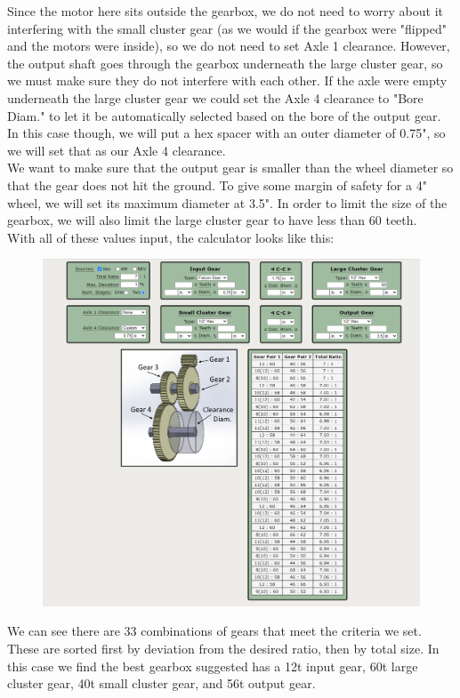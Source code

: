 \documentclass[a4paper]{article}
\begin{document}
	Since the motor here sits outside the gearbox, we do not need to worry about it interfering with the small cluster gear (as we would if the gearbox were "flipped" and the motors were inside), so we do not need to set Axle 1 clearance. However, the output shaft goes through the gearbox underneath the large cluster gear, so we must make sure they do not interfere with each other. If the axle were empty underneath the large cluster gear we could set the Axle 4 clearance to "Bore Diam." to let it be automatically selected based on the bore of the output gear. In this case though, we will put a hex spacer with an outer diameter of 0.75", so we will set that as our Axle 4 clearance.\\
	
	We want to make sure that the output gear is smaller than the wheel diameter so that the gear does not hit the ground. To give some margin of safety for a 4" wheel, we will set its maximum diameter at 3.5". In order to limit the size of the gearbox, we will also limit the large cluster gear to have less than 60 teeth.\\
	
	With all of these values input, the calculator looks like this:
	
	\begin{figure}[H]
		\centering
		\includegraphics[width=0.9\linewidth]{gearbox_options_screenshot}
	\end{figure}
	
	We can see there are 33 combinations of gears that meet the criteria we set. These are sorted first by deviation from the desired ratio, then by total size. In this case we find the best gearbox suggested has a 12t input gear, 60t large cluster gear, 40t small cluster gear, and 56t output gear.
	
	
	
\end{document}

